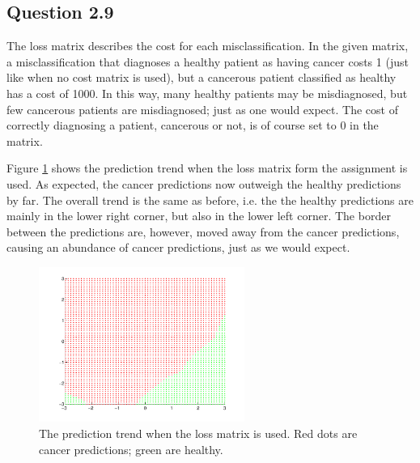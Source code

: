 \subsection*{Question 2.9}

The loss matrix describes the cost for each misclassification.  In the
given matrix, a misclassification that diagnoses a healthy patient as
having cancer costs 1 (just like when no cost matrix is used), but a
cancerous patient classified as healthy has a cost of 1000.  In this
way, many healthy patients may be misdiagnosed, but few cancerous
patients are misdiagnosed; just as one would expect.  The cost of
correctly diagnosing a patient, cancerous or not, is of course set to
$0$ in the matrix.

Figure \ref{fig:q29} shows the prediction trend when the loss matrix
form the assignment is used.  As expected, the cancer predictions now
outweigh the healthy predictions by far.  The overall trend is the
same as before, i.e. the the healthy predictions are mainly in the
lower right corner, but also in the lower left corner.  The border
between the predictions are, however, moved away from the cancer
predictions, causing an abundance of cancer predictions, just as we
would expect.

\begin{figure}[!htbp]
  \centering
  \includegraphics[width=0.6\textwidth]{./images/q209.pdf}
  \caption{The prediction trend when the loss matrix is used. Red dots
    are cancer predictions; green are healthy.}
  \label{fig:q29}
\end{figure}
